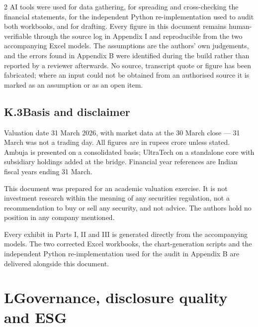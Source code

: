 \begin{paracol}{2}
AI tools were used for data gathering, for spreading and cross-checking the financial
statements, for the independent Python re-implementation used to audit both workbooks,
and for drafting. Every figure in this document remains human-verifiable through the
source log in Appendix I and reproducible from the two accompanying Excel models. The
assumptions are the authors' own judgements, and the errors found in Appendix B were
identified during the build rather than reported by a reviewer afterwards. No source,
transcript quote or figure has been fabricated; where an input could not be obtained
from an authorised source it is marked as an assumption or as an open item.

\subsection*{K.3\quad Basis and disclaimer}

Valuation date 31 March 2026, with market data at the 30 March close — 31 March was
not a trading day. All figures are in rupees crore unless stated. Ambuja is presented
on a consolidated basis; UltraTech on a standalone core with subsidiary holdings added
at the bridge. Financial year references are Indian fiscal years ending 31 March.

This document was prepared for an academic valuation exercise. It is not investment
research within the meaning of any securities regulation, not a recommendation to buy
or sell any security, and not advice. The authors hold no position in any company
mentioned.

\begin{keybox}
Every exhibit in Parts I, II and III is generated directly from the accompanying
models. The two corrected Excel workbooks, the chart-generation scripts and the
independent Python re-implementation used for the audit in Appendix B are delivered
alongside this document.
\end{keybox}
\end{paracol}

\clearpage
\section*{L\quad Governance, disclosure quality and ESG}

